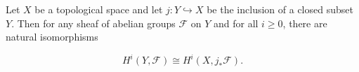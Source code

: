 Let $X$ be a topological space and let $j: Y \hookrightarrow X$ be the inclusion of a closed subset $Y$. Then for any sheaf of abelian groups $\mathcal{F}$ on $Y$ and for all $i \geq 0$, there are natural isomorphisms

$$H^i(Y, \mathcal{F}) \cong H^i(X, j_*\mathcal{F}).$$
